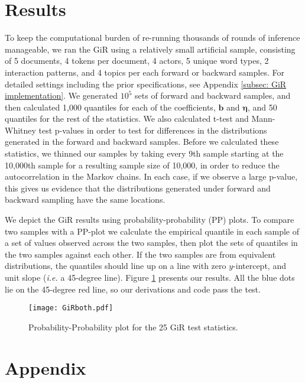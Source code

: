\documentclass[a4paper]{article}
\begin{document}
\section{Results}
To keep the computational burden of re-running thousands of rounds of inference manageable, we ran the GiR using a relatively small artificial sample, consisting of 5 documents, 4 tokens per document, 4 actors, 5 unique word types, 2 interaction patterns, and 4 topics per each forward or backward samples. For detailed settings including the prior specifications, see Appendix \ref{subsec: GiR implementation}.
We generated $10^5$ sets of forward and backward samples, and then calculated 1,000 quantiles for each of the coefficients, $\boldsymbol{b}$ and $\boldsymbol{\eta}$, and 50 quantiles for the rest of the statistics. We also calculated t-test and Mann-Whitney test p-values in order to test for differences in the distributions generated in the forward and backward samples. Before we calculated these statistics, we thinned our samples by taking every 9th sample starting at the 10,000th sample for a resulting sample size of 10,000, in order to reduce the autocorrelation in the Markov chains. In each case, if we observe a large p-value, this gives us evidence that the distributions generated under forward and backward sampling have the same locations. 

We depict the GiR results using probability-probability (PP) plots. To compare two samples with a PP-plot we calculate the empirical quantile in each sample of a set of values observed across the two samples, then plot the sets of quantiles in the two samples against each other. If the two samples are from equivalent distributions, the quantiles should line up on a line with zero $y$-intercept, and unit slope (\textit{i.e.} a 45-degree line). Figure \ref{fig:PPplot2} presents our results. All the blue dots lie on the
45-degree red line, so our derivations and code pass the test.
\begin{figure}[H]
	\centering
	\texttt{[image: GiRboth.pdf]} 
	\label{fig:PPplot2}
	\caption{Probability-Probability plot for the 25 GiR test statistics.}
\end{figure}


\appendix
 \section*{Appendix}
 \renewcommand{\thesubsection}{\Alph{subsection}}
\end{document}
